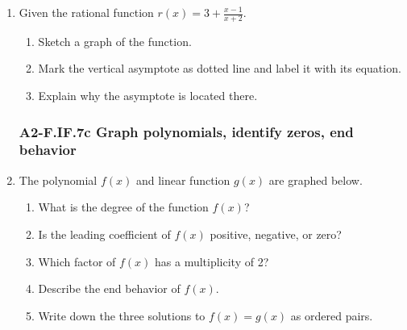 \documentclass[12pt, twoside]{article}
\begin{document}
\begin{enumerate}[itemsep=0.5cm]
\newpage
\item Given the rational function $\displaystyle r(x)= 3 + \frac{x-1}{x+2}$. 
    \begin{enumerate}[itemsep=0.25cm]
        \item Sketch a graph of the function.
        \item Mark the vertical asymptote as dotted line and label it with its equation.
        \item Explain why the asymptote is located there.
    \end{enumerate}
    \begin{center}
    \end{center}

\newpage
\subsubsection*{A2-F.IF.7c Graph polynomials, identify zeros, end behavior}
\item The polynomial $f(x)$ and linear function $g(x)$ are graphed below. 
\begin{multicols}{2}
    \begin{enumerate}[itemsep=0.6cm]
        \item What is the degree of the function $f(x)$?
        \item Is the leading coefficient of $f(x)$ positive, negative, or zero?
        \item Which factor of $f(x)$ has a multiplicity of 2?
        \item Describe the end behavior of $f(x)$. \vspace{2cm}
        \item Write down the three solutions to $f(x)=g(x)$ as ordered pairs.
    \end{enumerate} \vspace{1cm} \;

    \columnbreak


\end{multicols}
\end{enumerate}
\end{document}
